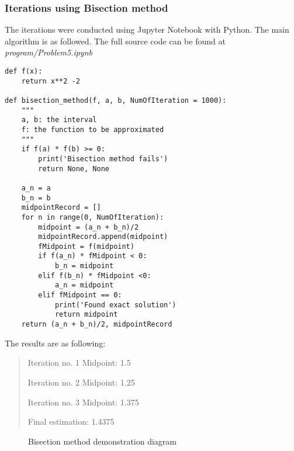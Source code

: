 \subsubsection{Iterations using Bisection method}
The iterations were conducted using Jupyter Notebook with Python. The main algorithm is as followed. The full source code can be found at \textit{program/Problem5.ipynb}
\begin{lstlisting}
def f(x):
    return x**2 -2 

def bisection_method(f, a, b, NumOfIteration = 1000):
    """
    a, b: the interval
    f: the function to be approximated
    """
    if f(a) * f(b) >= 0:
        print('Bisection method fails')
        return None, None
    
    a_n = a
    b_n = b
    midpointRecord = []
    for n in range(0, NumOfIteration):
        midpoint = (a_n + b_n)/2
        midpointRecord.append(midpoint)
        fMidpoint = f(midpoint)
        if f(a_n) * fMidpoint < 0:
            b_n = midpoint
        elif f(b_n) * fMidpoint <0:
            a_n = midpoint
        elif fMidpoint == 0:
            print('Found exact solution')
            return midpoint
    return (a_n + b_n)/2, midpointRecord
\end{lstlisting}

The results are as following:
\begin{quote}
Iteration no. 1
Midpoint:  1.5

Iteration no. 2
Midpoint:  1.25

Iteration no. 3
Midpoint:  1.375

Final estimation:  1.4375
\end{quote}

\begin{figure}[H]
\centering
{}
\caption{Bisection method demonstration diagram}
\end{figure}
\newpage

